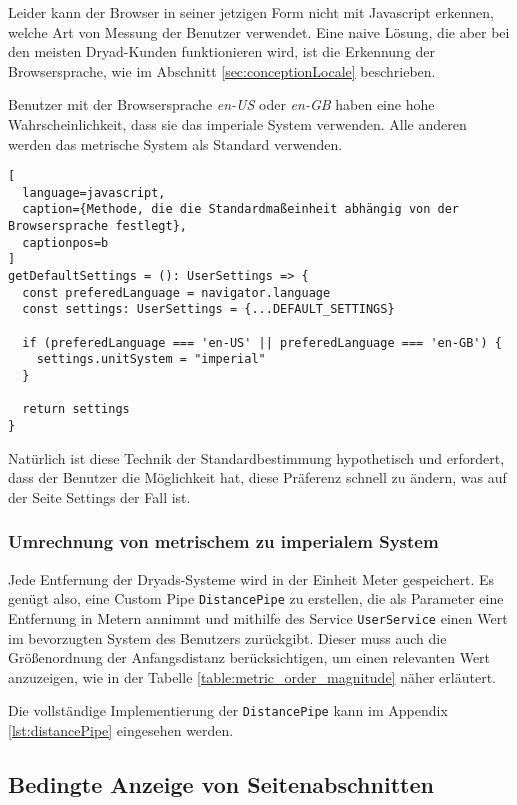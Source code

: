Leider kann der Browser in seiner jetzigen Form nicht mit Javascript erkennen, welche Art von Messung der Benutzer verwendet.
Eine naive Lösung, die aber bei den meisten Dryad-Kunden funktionieren wird, ist die Erkennung der Browsersprache, wie im Abschnitt \ref{sec:conceptionLocale} beschrieben.

Benutzer mit der Browsersprache \textit{en-US} oder \textit{en-GB} haben eine hohe Wahrscheinlichkeit, dass sie das imperiale System verwenden.
Alle anderen werden das metrische System als Standard verwenden.

\begin{lstlisting}[
  language=javascript,
  caption={Methode, die die Standardmaßeinheit abhängig von der Browsersprache festlegt},
  captionpos=b
]
getDefaultSettings = (): UserSettings => {
  const preferedLanguage = navigator.language
  const settings: UserSettings = {...DEFAULT_SETTINGS}

  if (preferedLanguage === 'en-US' || preferedLanguage === 'en-GB') {
    settings.unitSystem = "imperial"
  }

  return settings
}
\end{lstlisting}

Natürlich ist diese Technik der Standardbestimmung hypothetisch und erfordert, dass der Benutzer die Möglichkeit hat, diese Präferenz schnell zu ändern, was auf der Seite Settings der Fall ist.

\subsubsection{Umrechnung von metrischem zu imperialem System}

Jede Entfernung der Dryads-Systeme wird in der Einheit Meter gespeichert.
Es genügt also, eine Custom Pipe \lstinline{DistancePipe} zu erstellen, die als Parameter eine Entfernung in Metern annimmt und mithilfe des Service \lstinline{UserService} einen Wert im bevorzugten System des Benutzers zurückgibt.
Dieser muss auch die Größenordnung der Anfangsdistanz berücksichtigen, um einen relevanten Wert anzuzeigen, wie in der Tabelle \ref{table:metric_order_magnitude} näher erläutert.

Die vollständige Implementierung der \lstinline{DistancePipe} kann im Appendix \ref{lst:distancePipe} eingesehen werden.

\subsection{Bedingte Anzeige von Seitenabschnitten}

